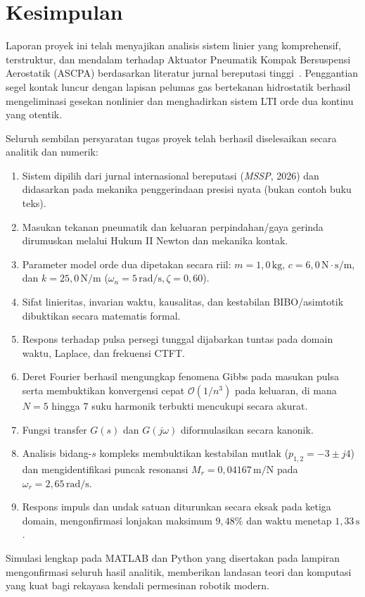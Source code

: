 \documentclass[journal]{IEEEtran}
\begin{document}
\section{Kesimpulan}
Laporan proyek ini telah menyajikan analisis sistem linier yang komprehensif, terstruktur, dan mendalam terhadap Aktuator Pneumatik Kompak Bersuspensi Aerostatik (ASCPA) berdasarkan literatur jurnal bereputasi tinggi~\cite{yang2026signal}. Penggantian segel kontak luncur dengan lapisan pelumas gas bertekanan hidrostatik berhasil mengeliminasi gesekan nonlinier dan menghadirkan sistem LTI orde dua kontinu yang otentik.

Seluruh sembilan persyaratan tugas proyek telah berhasil diselesaikan secara analitik dan numerik:
\begin{enumerate}
    \item Sistem dipilih dari jurnal internasional bereputasi (\textit{MSSP}, 2026) dan didasarkan pada mekanika penggerindaan presisi nyata (bukan contoh buku teks).
    \item Masukan tekanan pneumatik dan keluaran perpindahan/gaya gerinda dirumuskan melalui Hukum II Newton dan mekanika kontak.
    \item Parameter model orde dua dipetakan secara riil: $m = 1{,}0\,\text{kg}$, $c = 6{,}0\,\text{N}\cdot\text{s/m}$, dan $k = 25{,}0\,\text{N/m}$ ($\omega_n = 5\,\text{rad/s}, \zeta = 0{,}60$).
    \item Sifat linieritas, invarian waktu, kausalitas, dan kestabilan BIBO/asimtotik dibuktikan secara matematis formal.
    \item Respons terhadap pulsa persegi tunggal dijabarkan tuntas pada domain waktu, Laplace, dan frekuensi CTFT.
    \item Deret Fourier berhasil mengungkap fenomena Gibbs pada masukan pulsa serta membuktikan konvergensi cepat $\mathcal{O}(1/n^3)$ pada keluaran, di mana $N = 5$ hingga $7$ suku harmonik terbukti mencukupi secara akurat.
    \item Fungsi transfer $G(s)$ dan $G(j\omega)$ diformulasikan secara kanonik.
    \item Analisis bidang-$s$ kompleks membuktikan kestabilan mutlak ($p_{1,2} = -3 \pm j4$) dan mengidentifikasi puncak resonansi $M_r = 0{,}04167\,\text{m/N}$ pada $\omega_r = 2{,}65\,\text{rad/s}$.
    \item Respons impuls dan undak satuan diturunkan secara eksak pada ketiga domain, mengonfirmasi lonjakan maksimum $9{,}48\%$ dan waktu menetap $1{,}33\,\text{s}$.
\end{enumerate}
Simulasi lengkap pada MATLAB dan Python yang disertakan pada lampiran mengonfirmasi seluruh hasil analitik, memberikan landasan teori dan komputasi yang kuat bagi rekayasa kendali permesinan robotik modern.
\end{document}
